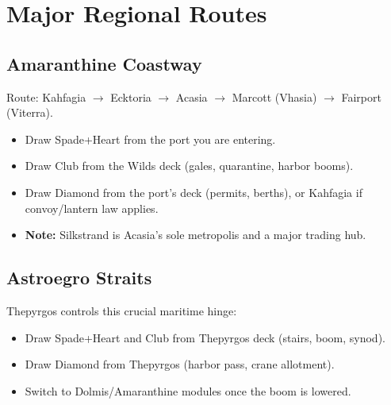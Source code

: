 \section{Major Regional Routes}
\label{sec:regional-routes}

\subsection{Amaranthine Coastway}
\label{subsec:amaranthine-coastway}

Route: Kahfagia $\rightarrow$ Ecktoria $\rightarrow$ Acasia $\rightarrow$ Marcott (Vhasia) $\rightarrow$ Fairport (Viterra).

\begin{itemize}
\item Draw Spade+Heart from the port you are entering.
\item Draw Club from the Wilds deck (gales, quarantine, harbor booms).
\item Draw Diamond from the port's deck (permits, berths), or Kahfagia if convoy/lantern law applies.
\item \textbf{Note:} Silkstrand is Acasia's sole metropolis and a major trading hub.
\end{itemize}

\subsection{Astroegro Straits}
\label{subsec:astroegro-straits}

Thepyrgos controls this crucial maritime hinge:
\begin{itemize}
\item Draw Spade+Heart and Club from Thepyrgos deck (stairs, boom, synod).
\item Draw Diamond from Thepyrgos (harbor pass, crane allotment).
\item Switch to Dolmis/Amaranthine modules once the boom is lowered.
\end{itemize}

